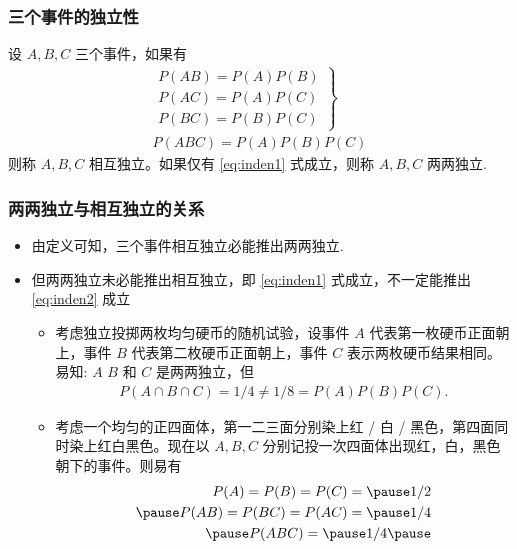    \begin{frame}
	\frametitle{三个事件的独立性}
	\begin{defi}
		设 $A,B,C$ 三个事件，如果有
		\begin{eqnarray}\label{eq:inden1}
			\left.\begin{array}{l}
				P(AB)=P(A)P(B)\\
				P(AC)=P(A)P(C) \\
				P(BC)=P(B)P(C)
			\end{array}\right\}\\
			\label{eq:inden2}
			P(ABC)=P(A)P(B)P(C)
		\end{eqnarray}
		则称 $A,B,C$ 相互独立。如果仅有 \eqref{eq:inden1} 式成立，则称 $A,B,C$ 两两独立.
	\end{defi}
\end{frame}

\begin{frame}
	\frametitle{两两独立与相互独立的关系}
	\begin{itemize}[<+-|alert@+>]
		\item 由定义可知，三个事件相互独立必能推出两两独立.
		\item 但两两独立未必能推出相互独立，即 \eqref{eq:inden1} 式成立，不一定能推出 \eqref{eq:inden2} 成立
		\begin{itemize}
			\item 考虑独立投掷两枚均匀硬币的随机试验，设事件 $A$ 代表第一枚硬币正面朝上，事件 $B$ 代表第二枚硬币正面朝上，事件 $C$ 表示两枚硬币结果相同。易知: \pause
			$A$ $B$ 和 $C$ 是两两独立，但
			\begin{align*}
				P(A\cap B\cap C)=1/4\neq 1/8=P(A)P(B)P(C).
			\end{align*}
			\item 考虑一个均匀的正四面体，第一二三面分别染上红 / 白 / 黑色，第四面同时染上红白黑色。现在以 $A,B,C$ 分别记投一次四面体出现红，白，黑色朝下的事件。则易有 \pause
			\begin{eqnarray*}
				P(A)=P(B)=P(C)=\pause 1/2\\ \pause
				P(AB)=P(BC)=P(AC)=\pause 1/4\\ \pause
				P(ABC)=\pause 1/4    \pause
			\end{eqnarray*}
		\end{itemize}\vspace{-0.7cm}
	\end{itemize}
\end{frame}

